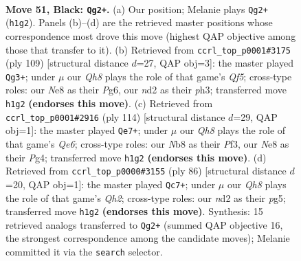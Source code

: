 \documentclass[11pt]{article}
\begin{document}
\clearpage

\begin{figure}[p]\centering
\begin{subfigure}{0.46\textwidth}\centering
\resizebox{\linewidth}{!}{%
\newchessgame
\chessboard[
  setfen={1n2n3/4k3/7p/Q7/P5K1/8/3N4/7q b - - 2 51},
  showmover=false,
  pgfstyle=straightmove, color=movearrow, markmove={h1-g2}
]}
\caption{}
\end{subfigure}\hfill
\begin{subfigure}{0.46\textwidth}\centering
\resizebox{\linewidth}{!}{%
\newchessgame
\chessboard[
  setfen={8/5p1k/Q5p1/P7/5q2/1K5P/8/8 b - - 3 55},
  showmover=false,
  pgfstyle=straightmove, color=movearrow, markmove={f4-g3}
]}
\caption{}
\end{subfigure}
\\[4pt]
\begin{subfigure}{0.46\textwidth}\centering
\resizebox{\linewidth}{!}{%
\newchessgame
\chessboard[
  setfen={8/6k1/4Q3/pq4p1/6P1/5P1K/8/8 w - - 16 58},
  showmover=false,
  pgfstyle=straightmove, color=movearrow, markmove={e6-e7}
]}
\caption{}
\end{subfigure}\hfill
\begin{subfigure}{0.46\textwidth}\centering
\resizebox{\linewidth}{!}{%
\newchessgame
\chessboard[
  setfen={8/1p4k1/6n1/1q4p1/4N1P1/8/2K4Q/8 w - - 8 44},
  showmover=false,
  pgfstyle=straightmove, color=movearrow, markmove={h2-c7}
]}
\caption{}
\end{subfigure}
\caption{\textbf{Move 51, Black: \texttt{Qg2+}.} (a) Our position; Melanie plays \texttt{Qg2+} (\texttt{h1g2}). Panels (b)--(d) are the retrieved master positions whose correspondence most drove this move (highest QAP objective among those that transfer to it). (b) Retrieved from \texttt{ccrl\_top\_p0001\#3175} (ply 109) [structural distance $d$=27, QAP obj=3]: the master played \texttt{Qg3+}; under $\mu$ our \emph{Qh8} plays the role of that game's \emph{Qf5}; cross-type roles: our \emph{N}e8 as their \emph{P}g6, our \emph{n}d2 as their \emph{p}h3; transferred move \texttt{h1g2} \textbf{(endorses this move)}. (c) Retrieved from \texttt{ccrl\_top\_p0001\#2916} (ply 114) [structural distance $d$=29, QAP obj=1]: the master played \texttt{Qe7+}; under $\mu$ our \emph{Qh8} plays the role of that game's \emph{Qe6}; cross-type roles: our \emph{N}b8 as their \emph{P}f3, our \emph{N}e8 as their \emph{P}g4; transferred move \texttt{h1g2} \textbf{(endorses this move)}. (d) Retrieved from \texttt{ccrl\_top\_p0000\#3155} (ply 86) [structural distance $d$=20, QAP obj=1]: the master played \texttt{Qc7+}; under $\mu$ our \emph{Qh8} plays the role of that game's \emph{Qh2}; cross-type roles: our \emph{n}d2 as their \emph{p}g5; transferred move \texttt{h1g2} \textbf{(endorses this move)}. Synthesis: 15 retrieved analogs transferred to \texttt{Qg2+} (summed QAP objective 16, the strongest correspondence among the candidate moves); Melanie committed it via the \texttt{search} selector.}
\label{fig:thought-m101}
\end{figure}
\end{document}
